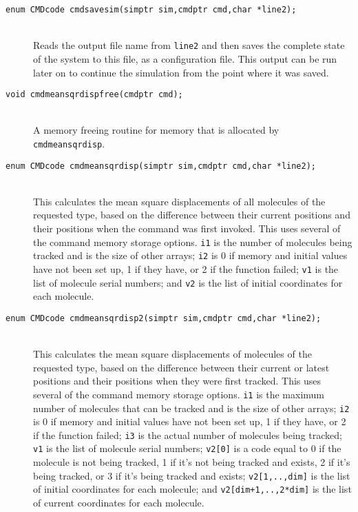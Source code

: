 \documentclass {scrbook}
\newcommand {\ttt} {\texttt}
\begin{document}
\begin{description}
\item[\ttt{enum CMDcode cmdsavesim(simptr sim,cmdptr cmd,char *line2);}]
\hfill \\
Reads the output file name from \ttt{line2} and then saves the complete state of the system to this file, as a configuration file. This output can be run later on to continue the simulation from the point where it was saved.

\item[\ttt{void cmdmeansqrdispfree(cmdptr cmd);}]
\hfill \\
A memory freeing routine for memory that is allocated by \ttt{cmdmeansqrdisp}.

\item[\ttt{enum CMDcode cmdmeansqrdisp(simptr sim,cmdptr cmd,char *line2);}]
\hfill \\
This calculates the mean square displacements of all molecules of the requested type, based on the difference between their current positions and their positions when the command was first invoked. This uses several of the command memory storage options. \ttt{i1} is the number of molecules being tracked and is the size of other arrays; \ttt{i2} is 0 if memory and initial values have not been set up, 1 if they have, or 2 if the function failed; \ttt{v1} is the list of molecule serial numbers; and \ttt{v2} is the list of initial coordinates for each molecule.

\item[\ttt{enum CMDcode cmdmeansqrdisp2(simptr sim,cmdptr cmd,char *line2);}]
\hfill \\
This calculates the mean square displacements of molecules of the requested type, based on the difference between their current or latest positions and their positions when they were first tracked. This uses several of the command memory storage options. \ttt{i1} is the maximum number of molecules that can be tracked and is the size of other arrays; \ttt{i2} is 0 if memory and initial values have not been set up, 1 if they have, or 2 if the function failed; \ttt{i3} is the actual number of molecules being tracked; \ttt{v1} is the list of molecule serial numbers; \ttt{v2[0]} is a code equal to 0 if the molecule is not being tracked, 1 if it's not being tracked and exists, 2 if it's being tracked, or 3 if it's being tracked and exists; \ttt{v2[1,..,dim]} is the list of initial coordinates for each molecule; and \ttt{v2[dim+1,..,2*dim]} is the list of current coordinates for each molecule.


\end{description}
\end{document}

